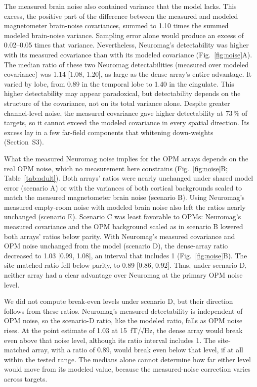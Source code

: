 \documentclass[preprint,12pt,authoryear,a4paper]{elsarticle}
\begin{document}
The measured brain noise also contained variance that the model lacks. This excess, the positive part of the difference between the measured and modeled magnetometer brain-noise covariances, summed to 1.10 times the summed modeled brain-noise variance. Sampling error alone would produce an excess of 0.02–0.05 times that variance. Nevertheless, Neuromag's detectability was higher with its measured covariance than with its modeled covariance (Fig.~\ref{fig:noise}A). The median ratio of these two Neuromag detectabilities (measured over modeled covariance) was 1.14 [1.08, 1.20], as large as the dense array's entire advantage. It varied by lobe, from 0.89 in the temporal lobe to 1.40 in the cingulate. This higher detectability may appear paradoxical, but detectability depends on the structure of the covariance, not on its total variance alone. Despite greater channel-level noise, the measured covariance gave higher detectability at 73\,\% of targets, so it cannot exceed the modeled covariance in every spatial direction. Its excess lay in a few far-field components that whitening down-weights (Section~S3).

What the measured Neuromag noise implies for the OPM arrays depends on the real OPM noise, which no measurement here constrains (Fig.~\ref{fig:noise}B; Table~\ref{tab:adult}). Both arrays' ratios were nearly unchanged under shared model error (scenario A) or with the variances of both cortical backgrounds scaled to match the measured magnetometer brain noise (scenario B). Using Neuromag's measured empty-room noise with modeled brain noise also left the ratios nearly unchanged (scenario E). Scenario C was least favorable to OPMs: Neuromag's measured covariance and the OPM background scaled as in scenario B lowered both arrays' ratios below parity. With Neuromag's measured covariance and OPM noise unchanged from the model (scenario D), the dense-array ratio decreased to 1.03 [0.99, 1.08], an interval that includes 1 (Fig.~\ref{fig:noise}B). The site-matched ratio fell below parity, to 0.89 [0.86, 0.92]. Thus, under scenario D, neither array had a clear advantage over Neuromag at the primary OPM noise level.

We did not compute break-even levels under scenario D, but their direction follows from these ratios. Neuromag's measured detectability is independent of OPM noise, so the scenario-D ratio, like the modeled ratio, falls as OPM noise rises. At the point estimate of 1.03 at 15~fT/√Hz, the dense array would break even above that noise level, although its ratio interval includes 1. The site-matched array, with a ratio of 0.89, would break even below that level, if at all within the tested range. The medians alone cannot determine how far either level would move from its modeled value, because the measured-noise correction varies across targets.
\end{document}

